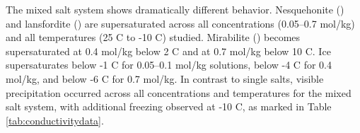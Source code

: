 \documentclass[journal=aesccq,manuscript=suppinfo]{achemso}
\begin{document}
The mixed salt system shows dramatically different behavior. Nesquehonite () and lansfordite () are supersaturated across all concentrations (0.05--0.7 mol/kg) and all temperatures (25 \textdegree C to -10 \textdegree C) studied. Mirabilite () becomes supersaturated at 0.4 mol/kg below 2 \textdegree C and at 0.7 mol/kg below 10 \textdegree C. Ice supersaturates below -1 \textdegree C for 0.05--0.1 mol/kg solutions, below -4 \textdegree C for 0.4 mol/kg, and below -6 \textdegree C for 0.7 mol/kg. In contrast to single salts, visible precipitation occurred across all concentrations and temperatures for the mixed salt system, with additional freezing observed at -10 \textdegree C, as marked in Table \ref{tab:conductivitydata}.

\end{document}

